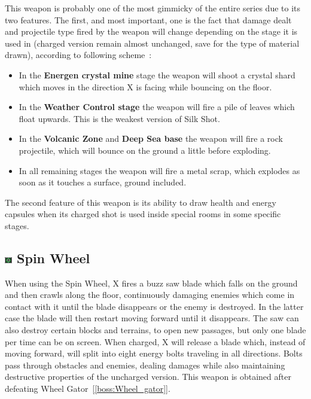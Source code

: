 This weapon is probably one of the most gimmicky of the entire series due to its two features. The first, and most important, one is the fact that damage dealt and projectile type fired by the weapon will change depending on the stage it is used in (charged version remain almost unchanged, save for the type of material drawn), according to following scheme~\cite{wiki:Silk_shot}:
\begin{itemize}
	\item In the \textbf{Energen crystal mine} stage the weapon will shoot a crystal shard which moves in the direction X is facing while bouncing on the floor.
	\item In the \textbf{Weather Control stage} the weapon will fire a pile of leaves  which float upwards. This is the weakest version of Silk Shot.
	\item In the \textbf{Volcanic Zone} and \textbf{Deep Sea base} the weapon will fire a rock projectile, which will bounce on the ground a little before exploding.
	\item In all remaining stages the weapon will fire a metal scrap, which explodes as soon as it touches a surface, ground included.
\end{itemize}

The second feature of this weapon is its ability to draw health and energy capsules when its charged shot is used inside special rooms in some specific stages.


\subsection{\includegraphics[width=12px, height=10px]{figures/X2/weapons/S_wheel.png} Spin Wheel}\label{Spinning_wheel}
When using the Spin Wheel, X fires a buzz saw blade which falls on the ground and then crawls along the floor, continuously damaging enemies which come in contact with it until the blade disappears or the enemy is destroyed. In the latter case the blade will then restart moving forward until it disappears. The saw can also destroy certain blocks and terrains, to open new passages, but only one blade per time can be on screen. When charged, X will release a blade which, instead of moving forward, will split into eight energy bolts traveling in all directions. Bolts pass through obstacles and enemies, dealing damages while also maintaining destructive properties of the uncharged version. This weapon is obtained after defeating Wheel Gator~[\ref{boss:Wheel_gator}].

